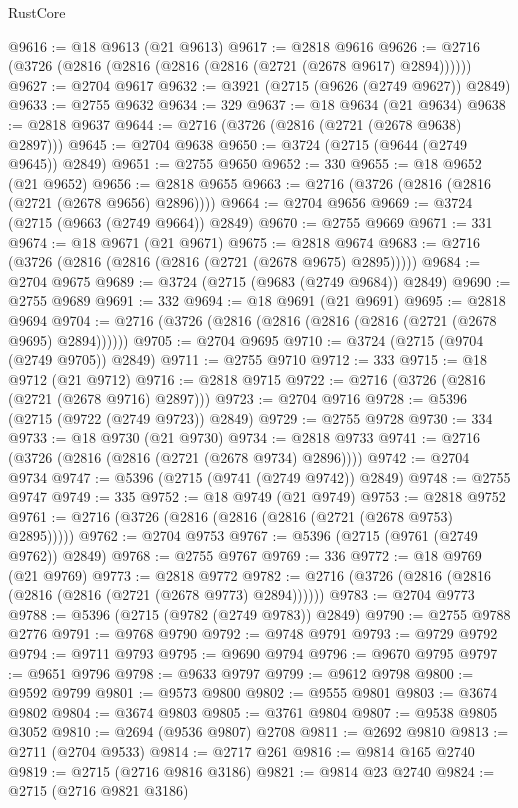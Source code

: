 \begin{lexlean}{RustCore}
\begin{coremodule}
@9616 := @18 @9613 (@21 @9613)
@9617 := @2818 @9616
@9626 := @2716 (@3726 (@2816 (@2816 (@2816 (@2816 (@2721 (@2678 @9617) @2894))))))
@9627 := @2704 @9617
@9632 := @3921 (@2715 (@9626 (@2749 @9627)) @2849)
@9633 := @2755 @9632
@9634 := 329
@9637 := @18 @9634 (@21 @9634)
@9638 := @2818 @9637
@9644 := @2716 (@3726 (@2816 (@2721 (@2678 @9638) @2897)))
@9645 := @2704 @9638
@9650 := @3724 (@2715 (@9644 (@2749 @9645)) @2849)
@9651 := @2755 @9650
@9652 := 330
@9655 := @18 @9652 (@21 @9652)
@9656 := @2818 @9655
@9663 := @2716 (@3726 (@2816 (@2816 (@2721 (@2678 @9656) @2896))))
@9664 := @2704 @9656
@9669 := @3724 (@2715 (@9663 (@2749 @9664)) @2849)
@9670 := @2755 @9669
@9671 := 331
@9674 := @18 @9671 (@21 @9671)
@9675 := @2818 @9674
@9683 := @2716 (@3726 (@2816 (@2816 (@2816 (@2721 (@2678 @9675) @2895)))))
@9684 := @2704 @9675
@9689 := @3724 (@2715 (@9683 (@2749 @9684)) @2849)
@9690 := @2755 @9689
@9691 := 332
@9694 := @18 @9691 (@21 @9691)
@9695 := @2818 @9694
@9704 := @2716 (@3726 (@2816 (@2816 (@2816 (@2816 (@2721 (@2678 @9695) @2894))))))
@9705 := @2704 @9695
@9710 := @3724 (@2715 (@9704 (@2749 @9705)) @2849)
@9711 := @2755 @9710
@9712 := 333
@9715 := @18 @9712 (@21 @9712)
@9716 := @2818 @9715
@9722 := @2716 (@3726 (@2816 (@2721 (@2678 @9716) @2897)))
@9723 := @2704 @9716
@9728 := @5396 (@2715 (@9722 (@2749 @9723)) @2849)
@9729 := @2755 @9728
@9730 := 334
@9733 := @18 @9730 (@21 @9730)
@9734 := @2818 @9733
@9741 := @2716 (@3726 (@2816 (@2816 (@2721 (@2678 @9734) @2896))))
@9742 := @2704 @9734
@9747 := @5396 (@2715 (@9741 (@2749 @9742)) @2849)
@9748 := @2755 @9747
@9749 := 335
@9752 := @18 @9749 (@21 @9749)
@9753 := @2818 @9752
@9761 := @2716 (@3726 (@2816 (@2816 (@2816 (@2721 (@2678 @9753) @2895)))))
@9762 := @2704 @9753
@9767 := @5396 (@2715 (@9761 (@2749 @9762)) @2849)
@9768 := @2755 @9767
@9769 := 336
@9772 := @18 @9769 (@21 @9769)
@9773 := @2818 @9772
@9782 := @2716 (@3726 (@2816 (@2816 (@2816 (@2816 (@2721 (@2678 @9773) @2894))))))
@9783 := @2704 @9773
@9788 := @5396 (@2715 (@9782 (@2749 @9783)) @2849)
@9790 := @2755 @9788 @2776
@9791 := @9768 @9790
@9792 := @9748 @9791
@9793 := @9729 @9792
@9794 := @9711 @9793
@9795 := @9690 @9794
@9796 := @9670 @9795
@9797 := @9651 @9796
@9798 := @9633 @9797
@9799 := @9612 @9798
@9800 := @9592 @9799
@9801 := @9573 @9800
@9802 := @9555 @9801
@9803 := @3674 @9802
@9804 := @3674 @9803
@9805 := @3761 @9804
@9807 := @9538 @9805 @3052
@9810 := @2694 (@9536 @9807) @2708
@9811 := @2692 @9810
@9813 := @2711 (@2704 @9533)
@9814 := @2717 @261
@9816 := @9814 @165 @2740
@9819 := @2715 (@2716 @9816 @3186)
@9821 := @9814 @23 @2740
@9824 := @2715 (@2716 @9821 @3186)

\end{coremodule}
\end{lexlean}
